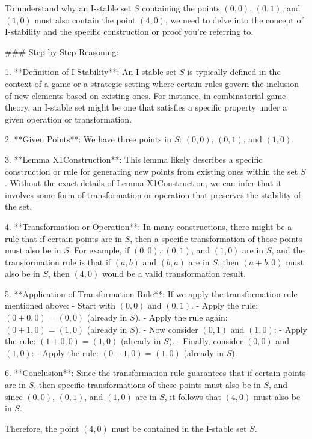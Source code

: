 To understand why an I-stable set \( S \) containing the points \((0,0)\), \((0,1)\), and \((1,0)\) must also contain the point \((4,0)\), we need to delve into the concept of I-stability and the specific construction or proof you're referring to.

### Step-by-Step Reasoning:

1. **Definition of I-Stability**: An I-stable set \( S \) is typically defined in the context of a game or a strategic setting where certain rules govern the inclusion of new elements based on existing ones. For instance, in combinatorial game theory, an I-stable set might be one that satisfies a specific property under a given operation or transformation.

2. **Given Points**: We have three points in \( S \): \((0,0)\), \((0,1)\), and \((1,0)\).

3. **Lemma X1Construction**: This lemma likely describes a specific construction or rule for generating new points from existing ones within the set \( S \). Without the exact details of Lemma X1Construction, we can infer that it involves some form of transformation or operation that preserves the stability of the set.

4. **Transformation or Operation**: In many constructions, there might be a rule that if certain points are in \( S \), then a specific transformation of those points must also be in \( S \). For example, if \((0,0)\), \((0,1)\), and \((1,0)\) are in \( S \), and the transformation rule is that if \((a,b)\) and \((b,a)\) are in \( S \), then \((a+b, 0)\) must also be in \( S \), then \((4,0)\) would be a valid transformation result.

5. **Application of Transformation Rule**: If we apply the transformation rule mentioned above:
   - Start with \((0,0)\) and \((0,1)\).
   - Apply the rule: \((0+0, 0) = (0,0)\) (already in \( S \)).
   - Apply the rule again: \((0+1, 0) = (1,0)\) (already in \( S \)).
   - Now consider \((0,1)\) and \((1,0)\):
     - Apply the rule: \((1+0, 0) = (1,0)\) (already in \( S \)).
   - Finally, consider \((0,0)\) and \((1,0)\):
     - Apply the rule: \((0+1, 0) = (1,0)\) (already in \( S \)).

6. **Conclusion**: Since the transformation rule guarantees that if certain points are in \( S \), then specific transformations of these points must also be in \( S \), and since \((0,0)\), \((0,1)\), and \((1,0)\) are in \( S \), it follows that \((4,0)\) must also be in \( S \).

Therefore, the point \((4,0)\) must be contained in the I-stable set \( S \).